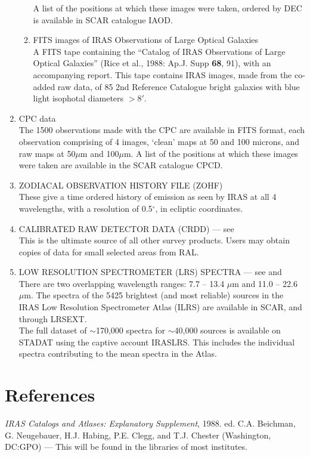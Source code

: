 \documentclass[11pt,nolof,noabs]{starlink}
\begin{document}
\begin{enumerate}
\begin{enumerate}
	A list of the positions at which these images were taken, ordered by
        DEC is available in SCAR catalogue IAOD.
	\item FITS images of IRAS Observations of Large Optical Galaxies\\
         A FITS tape containing the ``Catalog of IRAS Observations of Large
         Optical Galaxies'' (Rice et al., 1988: Ap.J. Supp \textbf{68}, 91),
         with an accompanying report. This tape contains IRAS images, made
         from the co-added raw data, of 85 2nd Reference Catalogue bright
         galaxies with blue light isophotal diameters $>$8$'$.

	\end{enumerate}
\item CPC data \\
         The 1500 observations made with the CPC are available in FITS format,
         each observation comprising of 4 images, `clean' maps at 50 and 100
         microns, and raw maps at 50$\mu$m and 100$\mu$m.
         A list of the positions at which these images were taken are available
         in the SCAR catalogue CPCD.
\item ZODIACAL OBSERVATION HISTORY FILE (ZOHF) \\
         These give a time ordered history of emission as seen by IRAS at all
         4 wavelengths,
         with a resolution of 0.5$^{\circ}$, in ecliptic coordinates.
\item CALIBRATED RAW DETECTOR DATA (CRDD) --- see \\
	This is the ultimate source of all other survey products.
	Users may obtain copies of data for small selected areas from RAL.
\item LOW RESOLUTION SPECTROMETER (LRS) SPECTRA --- see  and \\
There are two overlapping wavelength ranges: 7.7 -- 13.4 $\mu$m and
11.0 -- 22.6 $\mu$m.
The spectra of the 5425 brightest (and most reliable) sources in the IRAS Low
Resolution Spectrometer Atlas (ILRS) are available in SCAR, and through
LRSEXT.\\
The full dataset of $\sim$170,000 spectra for $\sim$40,000 sources is
available on STADAT using the captive account IRASLRS.
This includes the individual spectra contributing to the mean spectra in
the Atlas.
\end{enumerate}

\section{References}
\emph{IRAS Catalogs and Atlases: Explanatory Supplement}, 1988. ed. C.A.
Beichman, G. Neugebauer, H.J. Habing, P.E. Clegg, and T.J. Chester (Washington,
DC:GPO) --- This will be found in the libraries of most institutes.
\end{document}
